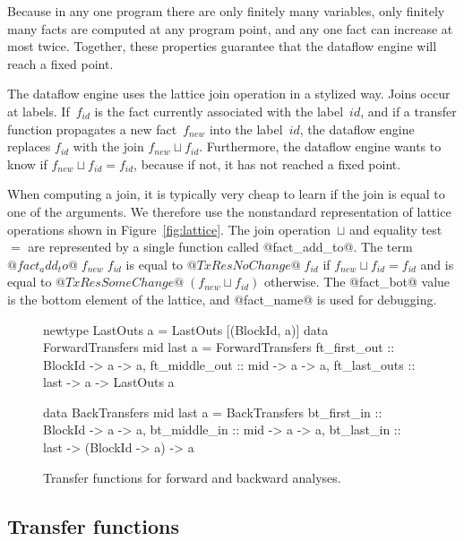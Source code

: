 \documentclass[blockstyle,preprint,nocopyrightspace]{sigplanconf}
\newcommand\join{\sqcup}
\newcommand\seclabel[1]{\label{sec:#1}}
\newcommand\figref[1]{Figure~\ref{fig:#1}}
\newcommand\figlabel[1]{\label{fig:#1}}
\begin{document}
Because in any one program there are only finitely many variables,
only finitely many facts are computed at any program point, 
and any one fact can increase at most twice.
Together, these properties
guarantee that the dataflow engine will
reach a fixed point.



The dataflow engine uses the lattice join operation in a stylized way.
Joins occur at labels.
If~$f_{\mathit{id}}$ is the fact currently associated with the
label~$\mathit{id}$, 
and if a transfer function propagates a new fact~$f_{\mathit{new}}$
into the label~$\mathit{id}$, 
the dataflow engine replaces $f_{\mathit{id}}$ with
the join  $f_{\mathit{new}} \join f_{\mathit{id}}$.
Furthermore, the dataflow engine wants to know if
  $f_{\mathit{new}} \join f_{\mathit{id}} = f_{\mathit{id}}$,
because if not, it has not reached a fixed point.

When computing a join, 
it is typically very cheap to learn if the join
is equal to one of the arguments.
We therefore use the nonstandard representation of lattice operations
shown in \figref{lattice}.
The join operation~$\join$ and equality test~$=$ are represented by a
single function called @fact_add_to@.
The term $@fact_add_to@\;f_{\mathit{new}}\;f_{\mathit{id}}$ is equal to
$@TxRes NoChange@\; f_{\mathit{id}}$ if $f_{\mathit{new}} \join f_{\mathit{id}} = f_{\mathit{id}}$
and is equal to
$@TxRes SomeChange@\; (f_{\mathit{new}} \join f_{\mathit{id}})$ otherwise.
The @fact_bot@ value is the bottom element of the
lattice, 
and @fact_name@  is used for debugging.

\begin{figure}
\begin{code}
newtype LastOuts a = LastOuts [(BlockId, a)] 
data ForwardTransfers mid last a = ForwardTransfers
 {ft_first_out  :: BlockId -> a -> a,
  ft_middle_out :: mid     -> a -> a,
  ft_last_outs  :: last    -> a -> LastOuts a} 

data BackTransfers mid last a = BackTransfers
 {bt_first_in  :: BlockId -> a              -> a,
  bt_middle_in :: mid     -> a              -> a,
  bt_last_in   :: last    -> (BlockId -> a) -> a} 
\end{code}
\caption{Transfer functions for forward and backward analyses.}
\figlabel{transfers}
%
%
\end{figure}



\subsection{Transfer functions} \seclabel{tffuns}
\end{document}
